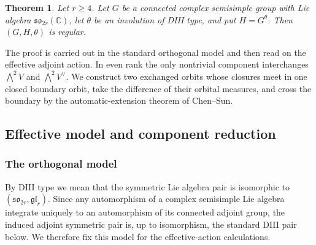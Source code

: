 \documentclass[10pt,a4paper]{amsart}
\numberwithin{equation}{section}
\newtheorem{theorem}{Theorem}[section]
\newcommand{\C}{\mathbb C}
\begin{document}
\begin{theorem}\label{thm:DIII-main}
Let $r\ge4$.  Let $G$ be a connected complex semisimple group with Lie algebra
$\mathfrak{so}_{2r}(\C)$, let $\theta$ be an involution of DIII type, and put
$H=G^\theta$.  Then $(G,H,\theta)$ is regular.
\end{theorem}

The proof is carried out in the standard orthogonal model and then read on the
effective adjoint action.  In even rank the only nontrivial component interchanges
$\bigwedge^2V$ and $\bigwedge^2V^\vee$.  We construct two exchanged orbits whose
closures meet in one closed boundary orbit, take the difference of their orbital
measures, and cross the boundary by the automatic-extension theorem of
Chen--Sun.

\subsection{Effective model and component reduction}
\subsubsection{The orthogonal model}

By DIII type we mean that the symmetric Lie algebra pair is isomorphic to
$(\mathfrak{so}_{2r},\mathfrak{gl}_r)$.  Since any automorphism of a complex semisimple Lie algebra 
integrate uniquely to an automorphism of its connected adjoint group, the induced adjoint symmetric 
pair is, up to isomorphism, the standard DIII pair below.  We therefore fix this model for the 
effective-action calculations.
\end{document}
